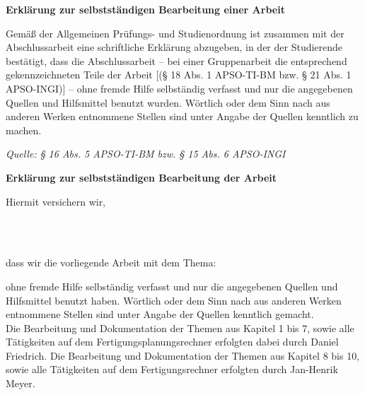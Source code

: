 \clearpage
\thispagestyle{plain}
\textbf{\sffamily\large Erklärung zur selbstständigen Bearbeitung einer Arbeit}

{\footnotesize
Gemäß der Allgemeinen Prüfungs- und Studienordnung ist zusammen mit der Abschlussarbeit eine schriftliche Erklärung abzugeben, in der der Studierende bestätigt, dass die Abschlussarbeit \glqq– bei einer Gruppenarbeit die entsprechend gekennzeichneten Teile der Arbeit [(§ 18 Abs. 1 APSO-TI-BM bzw. § 21 Abs. 1 APSO-INGI)] – ohne fremde Hilfe selbständig verfasst und nur die angegebenen Quellen und Hilfsmittel benutzt wurden. Wörtlich oder dem Sinn nach aus anderen Werken entnommene Stellen sind unter Angabe der Quellen kenntlich zu machen.\grqq
}

\hfill {\em\footnotesize Quelle: § 16 Abs. 5 APSO-TI-BM bzw. § 15 Abs. 6 APSO-INGI}

\vspace{1cm}
\textbf{\sffamily Erklärung zur selbstständigen Bearbeitung der Arbeit}

Hiermit versichern wir,\\

\par\noindent{}    \makebox[8cm]{\hrulefill}
\par\noindent{} \makebox[8cm]{\hrulefill}\\

\par\noindent{}    \makebox[8cm]{\hrulefill}
\par\noindent{} \makebox[8cm]{\hrulefill}\\

dass wir die vorliegende Arbeit mit dem Thema:

\textbf{\IthesisTitle}

ohne fremde Hilfe selbständig verfasst und nur die angegebenen Quellen und Hilfsmittel benutzt haben.
Wörtlich oder dem Sinn nach aus anderen Werken entnommene Stellen sind unter Angabe der Quellen kenntlich gemacht.\\

Die Bearbeitung und Dokumentation der Themen aus Kapitel 1 bis 7, sowie alle Tätigkeiten auf dem Fertigungsplanungsrechner erfolgten dabei durch Daniel Friedrich.
Die Bearbeitung und Dokumentation der Themen aus Kapitel 8 bis 10, sowie alle Tätigkeiten auf dem Fertigungsrechner erfolgten durch Jan-Henrik Meyer.

